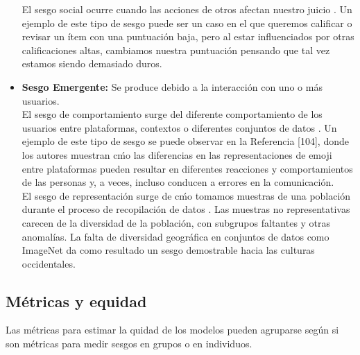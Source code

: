 \documentclass[runningheads,a4paper]{llncs}
\begin{document}
\begin{itemize}
El sesgo social ocurre cuando las acciones de otros afectan nuestro juicio \cite{Ricardo}. Un ejemplo de este tipo de sesgo 
puede ser un caso en el que queremos calificar o revisar un \'item con una puntuaci\'on baja, pero al estar influenciados por 
otras calificaciones altas, cambiamos nuestra puntuaci\'on pensando que tal vez estamos siendo demasiado duros.\\
 
\item {\bf Sesgo Emergente:} Se produce debido a la interacci\'on con uno o m\'as usuarios.\\

El sesgo de comportamiento surge del diferente comportamiento de los usuarios entre plataformas, 
contextos o diferentes conjuntos de datos \cite{Alex}. Un ejemplo de este tipo de sesgo se puede observar en la Referencia 
[104], donde los autores muestran c\'mo las diferencias en las representaciones de emoji entre plataformas pueden resultar en
 diferentes reacciones y comportamientos de las personas y, a veces, incluso conducen a errores en la comunicaci\'on.\\
 
 El sesgo de representaci\'on surge de c\'mo tomamos muestras de una poblaci\'on durante 
el proceso de recopilaci\'on de datos \cite{Ha}. Las muestras no representativas carecen de la diversidad de la poblaci\'on, 
con subgrupos faltantes y otras anomal\'ias. La falta de diversidad geogr\'afica en conjuntos de datos como ImageNet da
 como resultado un sesgo demostrable hacia las culturas occidentales.

\end{itemize}

\subsection{M\'etricas y equidad}

 Las m\'etricas para estimar la quidad de los modelos pueden agruparse seg\'un si son m\'etricas para medir sesgos en grupos o en
individuos.\\
\end{document}
